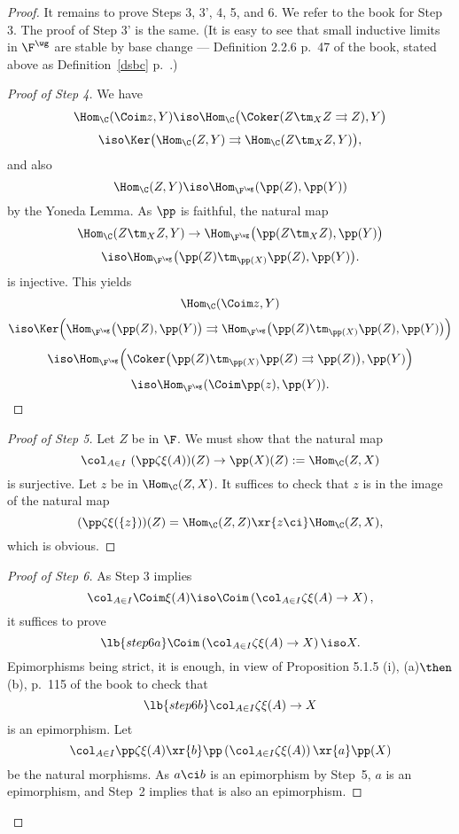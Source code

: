 \documentclass[12pt]{article}
\theoremstyle{remark}
\theoremstyle{definition}
\begin{document}
\begin{proof}
It remains to prove Steps 3, 3', 4, 5, and 6. We refer to the book for Step 3. The proof of Step 3' is the same. (It is easy to see that small inductive limits in $\F^\wg$ are stable by base change --- Definition 2.2.6 p.~47 of the book, stated above as Definition~\ref{dsbc} p.~.) 

\begin{proof}[Proof of Step 4] 
We have 
$$
\Hom_\C(\Coim z,Y)\iso\Hom_\C\big(\Coker(Z\tm_XZ\rightrightarrows Z),Y\big)
$$
$$
\iso\Ker\big(\Hom_\C(Z,Y)\rightrightarrows\Hom_\C(Z\tm_XZ,Y)\big),
$$ 
and also 
$$
\Hom_\C(Z,Y)\iso\Hom_{\F^\wg}(\pp(Z),\pp(Y))
$$ 
by the Yoneda Lemma. As $\pp$ is faithful, the natural map 
$$
\Hom_\C(Z\tm_XZ,Y)\to\Hom_{\F^\wg}\big(\pp(Z\tm_XZ),\pp(Y)\big)
$$
$$
\iso\Hom_{\F^\wg}\big(\pp(Z)\tm_{\pp(X)}\pp(Z),\pp(Y)\big).
$$ 
is injective. This yields 
$$
\Hom_\C(\Coim z,Y)
$$
$$
\iso\Ker\Big(\Hom_{\F^\wg}\big(\pp(Z),\pp(Y)\big)\rightrightarrows\Hom_{\F^\wg}\big(\pp(Z)\tm_{\pp(X)}\pp(Z),\pp(Y)\big)\Big)
$$
$$
\iso\Hom_{\F^\wg}\Big(\Coker\big(\pp(Z)\tm_{\pp(X)}\pp(Z)\rightrightarrows\pp(Z)\big),\pp(Y)\Big)
$$
$$
\iso\Hom_{\F^\wg}(\Coim\pp(z),\pp(Y)).
$$ 
\end{proof}

\begin{proof}[Proof of Step 5]
Let $Z$ be in $\F$. We must show that the natural map 
$$
\col_{A\in I}\ (\pp\zeta\xi(A))(Z)\to\pp(X)(Z):=\Hom_\C(Z,X) 
$$
is surjective. Let $z$ be in $\Hom_\C(Z,X)$. It suffices to check that $z$ is in the image of the natural map 
$$
(\pp\zeta\xi(\{z\}))(Z)=\Hom_\C(Z,Z)\xr{z\ci}\Hom_\C(Z,X),
$$
which is obvious. 
\end{proof}

\begin{proof}[Proof of Step 6] 
As Step 3 implies 
$$
\col_{A\in I}\Coim\xi(A)\iso\Coim\left(\col_{A\in I}\zeta\xi(A)\to X\right),
$$ 
it suffices to prove 
%
\begin{equation}\lb{step6a}
\Coim\left(\col_{A\in I}\zeta\xi(A)\to X\right)\iso X.
\end{equation}
% 
Epimorphisms being strict, it is enough, in view of Proposition 5.1.5 (i), (a)$\then$(b), p.~115 of the book to check that 
%
\begin{equation}\lb{step6b}
\col_{A\in I}\zeta\xi(A)\to X
\end{equation}
% 
is an epimorphism. Let 
$$
\col_{A\in I}\pp\zeta\xi(A)\xr{b}\pp\left(\col_{A\in I}\zeta\xi(A)\right)\xr{a}\pp(X)
$$
be the natural morphisms. As $a\ci b$ is an epimorphism by Step~5, $a$ is an epimorphism, and Step~2 implies that  is also an epimorphism. 
\end{proof}
\end{proof}
\end{document}
